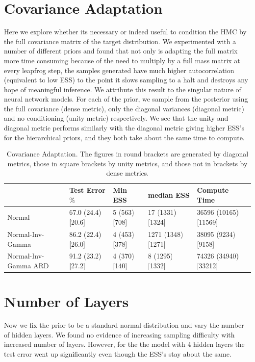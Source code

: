 \documentclass[12pt]{report}
\begin{document}
\section{Covariance Adaptation}
Here we explore whether its necessary or indeed useful to condition the HMC by the full covariance matrix of the target distribution. We experimented with a number of different priors and found that not only is adapting the full matrix more time consuming because of the need to multiply by a full mass matrix at every leapfrog step, the samples generated have much higher autocorrelation (equivalent to low ESS) to the point it slows sampling to a halt and destroys any hope of meaningful inference. We attribute this result to the singular nature of neural network models. For each of the prior, we sample from the posterior using the full covariance (dense metric), only the diagonal variances (diagonal metric) and no conditioning (unity metric) respectively. We see that the unity and diagonal metric performs similarly with the diagonal metric giving higher ESS's for the hierarchical priors, and they both take about the same time to compute.

\begin{table}[]
\footnotesize
\begin{tabular}{@{}lllll@{}}
\toprule
                     & Test Error$\%$ & Min ESS & median ESS & Compute Time \\ \midrule
Normal               & 67.0 (24.4) [20.6]   & 5 (563) [708] & 17 (1331) [1324]  & 36596 (10165) [11569]     \\ \midrule
Normal-Inv-Gamma     & 86.2 (22.4) [26.0]  & 4 (453) [378]  & 1271 (1348) [1271]    & 38095 (9234) [9158]     \\ \midrule
Normal-Inv-Gamma ARD & 91.2 (23.2) [27.2]  & 4 (370) [140]  & 8 (1295) [1332]    & 74326 (34940) [33212]     \\ \bottomrule
\end{tabular}
\caption{Covariance Adaptation. The figures in round brackets are generated by diagonal metrics, those in square brackets by unity metrics, and those not in brackets by dense metrics. }
\label{my-label}
\end{table}

\section{Number of Layers}
Now we fix the prior to be a standard normal distribution and vary the number of hidden layers. We found no evidence of increasing sampling difficulty with increased number of layers. 
However, for the the model with 4 hidden layers the test error went up significantly even though the ESS's stay about the same. 
\end{document}
